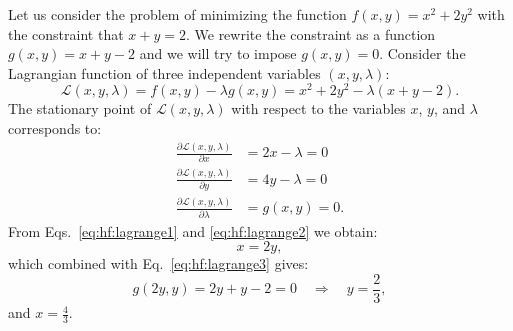 \documentclass[../Main/chem532-notes.tex]{subfiles}
\begin{document}
\begin{example}
Let us consider the problem of minimizing the function $f(x,y) = x^2 + 2 y^2$ with the constraint that $x + y = 2$.
We rewrite the constraint as a function $g(x,y) = x + y - 2$ and we will try to impose $g(x,y) = 0$.
Consider the Lagrangian function of three independent variables $(x,y,\lambda)$:
\begin{equation}
\mathcal{L}(x,y,\lambda) = f(x,y) - \lambda g(x,y) =  x^2 + 2 y^2 - \lambda (x + y - 2).
\end{equation}
The stationary point of $\mathcal{L}(x,y,\lambda)$ with respect to the variables $x$, $y$, and $\lambda$ corresponds to:
\begin{align}
\frac{\partial \mathcal{L}(x,y,\lambda)}{\partial x} &= 2 x - \lambda = 0 \label{eq:hf:lagrange1}\\
\frac{\partial \mathcal{L}(x,y,\lambda)}{\partial y} &= 4 y - \lambda = 0 \label{eq:hf:lagrange2}\\
\frac{\partial \mathcal{L}(x,y,\lambda)}{\partial \lambda} &= g(x,y)  = 0.\label{eq:hf:lagrange3}
\end{align}
From Eqs.~\eqref{eq:hf:lagrange1} and \eqref{eq:hf:lagrange2} we obtain:
\begin{equation}
x = 2y,
\end{equation}
which combined with Eq.~\eqref{eq:hf:lagrange3} gives: 
\begin{equation}
g(2y,y)  = 2y + y - 2 = 0 \quad \Rightarrow \quad y = \frac{2}{3},
\end{equation}
and $x = \frac{4}{3}$.
\end{example}
\end{document}
